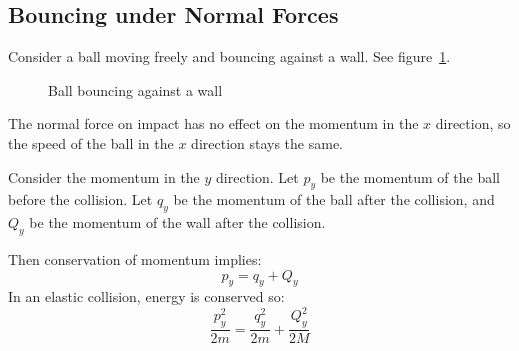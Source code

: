 \documentclass[../Main.tex]{subfiles}
\begin{document}
\subsection{Bouncing under Normal Forces}
Consider a ball moving freely and bouncing against a wall. See figure~\ref{figBallBounceWall}.
\begin{figure}[ht]
    \centering
    \caption{Ball bouncing against a wall}
    \label{figBallBounceWall}
\end{figure}
The normal force on impact has no effect on the momentum in the $x$ direction, so the speed of the ball in the $x$ direction stays the same.\par
Consider the momentum in the $y$ direction. Let $p_y$ be the momentum of the ball before the collision. Let $q_y$ be the momentum of the ball after the collision, and $Q_y$ be the momentum of the wall after the collision.\par
Then conservation of momentum implies:
\begin{equation}
    p_y = q_y + Q_y
    \label{eqnBounceCOM}
\end{equation}
In an elastic collision, energy is conserved so:
\begin{equation}
    \frac{p_y^2}{2m} = \frac{q_y^2}{2m} + \frac{Q_y^2}{2M}
    \label{eqnBounceCOE}
\end{equation}
\end{document}
